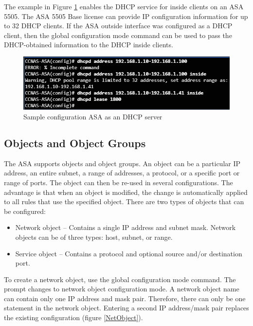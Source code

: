The example in Figure \ref{DHCPcommand} enables the DHCP service for inside clients on an ASA 5505. The ASA 5505 Base license can provide IP configuration information for up to 32 DHCP clients. If the ASA outside interface was configured as a DHCP client, then the  global configuration mode command can be used to pass the DHCP-obtained information to the DHCP inside clients.

\begin{figure}[hbtp]
\caption{Sample configuration ASA as an DHCP server}\label{DHCPcommand}
\centering
\includegraphics[scale=0.5]{pictures/DHCPcommand.PNG}
\end{figure}

\subsection{Objects and Object Groups}

The ASA supports objects and object groups. An object can be a particular IP address, an entire subnet, a range of addresses, a protocol, or a specific port or range of ports. The object can then be re-used in several configurations. The advantage is that when an object is modified, the change is automatically applied to all rules that use the specified object. There are two types of objects that can be configured:

\begin{itemize}
\item Network object -- Contains a single IP address and subnet mask. Network objects can be of three types: host, subnet, or range. 
\item Service object -- Contains a protocol and optional source and/or destination port.
\end{itemize}

To create a network object, use the  global configuration mode command. The prompt changes to network object configuration mode. A network object name can contain only one IP address and mask pair. Therefore, there can only be one statement in the network object. Entering a second IP address/mask pair replaces the existing configuration (figure \ref{NetObject}).

